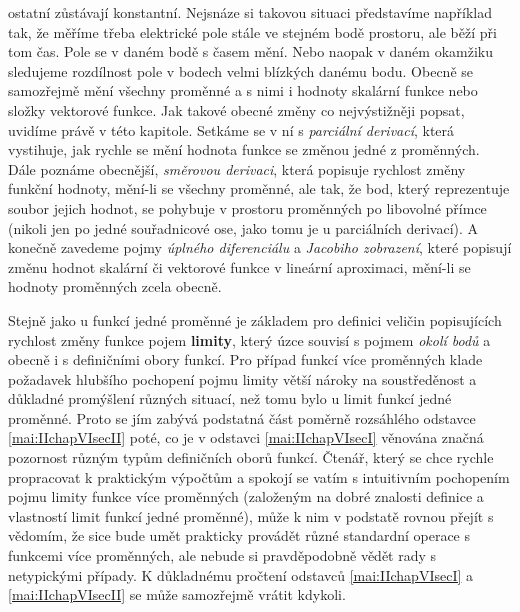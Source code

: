   ostatní zůstávají konstantní. Nejsnáze si takovou situaci představíme například tak, že měříme
  třeba elektrické pole stále ve stejném bodě prostoru, ale běží při tom čas. Pole se v daném bodě s
  časem mění. Nebo naopak v daném okamžiku sledujeme rozdílnost pole v bodech velmi blízkých danému
  bodu. Obecně se samozřejmě mění všechny proměnné a s nimi i hodnoty skalární funkce nebo složky
  vektorové funkce. Jak takové obecné změny co nejvýstižněji popsat, uvidíme právě v této kapitole.
  Setkáme se v ní s \emph{parciální derivací}, která vystihuje, jak rychle se mění hodnota funkce se
  změnou jedné z proměnných. Dále poznáme obecnější, \emph{směrovou derivaci}, která popisuje
  rychlost změny funkční hodnoty, mění-li se všechny proměnné, ale tak, že bod, který reprezentuje
  soubor jejich hodnot, se pohybuje v prostoru proměnných po libovolné přímce (nikoli jen po jedné
  souřadnicové ose, jako tomu je u parciálních derivací). A konečně zavedeme pojmy \emph{úplného
  diferenciálu} a \emph{Jacobiho zobrazení}, které popisují změnu hodnot skalární či vektorové
  funkce v lineární aproximaci, mění-li se hodnoty proměnných zcela obecně.

  Stejně jako u funkcí jedné proměnné je základem pro definici veličin popisujících rychlost změny
  funkce pojem \textbf{limity}, který úzce souvisí s pojmem \emph{okolí bodů} a obecně i s
  definičními obory funkcí. Pro případ funkcí více proměnných klade požadavek hlubšího pochopení
  pojmu limity větší nároky na soustředěnost a důkladné promýšlení různých situací, než tomu bylo u
  limit funkcí jedné proměnné. Proto se jím zabývá podstatná část poměrně rozsáhlého odstavce
  \ref{mai:IIchapVIsecII} poté, co je v odstavci \ref{mai:IIchapVIsecI} věnována značná pozornost
  různým typům definičních oborů funkcí. Čtenář, který se chce rychle propracovat k praktickým
  výpočtům a spokojí se vatím s intuitivním pochopením pojmu limity funkce více proměnných
  (založeným na dobré znalosti definice a vlastností limit funkcí jedné proměnné), může k nim v
  podstatě rovnou přejít s vědomím, že sice bude umět prakticky provádět různé standardní operace s
  funkcemi více proměnných, ale nebude si pravděpodobně vědět rady s netypickými případy. K
  důkladnému pročtení odstavců \ref{mai:IIchapVIsecI} a \ref{mai:IIchapVIsecII} se může samozřejmě
  vrátit kdykoli.

